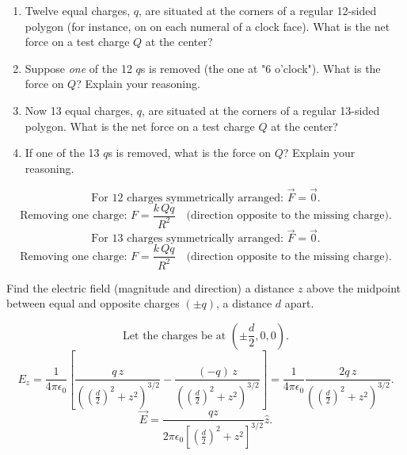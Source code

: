 \begin{hwkProblem}{2.1}{}

	\begin{enumerate}
		\item Twelve equal charges, \( q \), are situated at the corners of a regular 12-sided polygon (for instance, on on each numeral of a clock face). What is the net force on a test charge \( Q \) at the center?
		\item Suppose \textit{one} of the 12 \( q \)s is removed (the one at "6 o'clock"). What is the force on \( Q \)? Explain your reasoning.
		\item Now 13 equal charges, \( q \), are situated at the corners of a regular 13-sided polygon. What is the net force on a test charge \( Q \) at the center?
		\item If one of the 13 \( q \)s is removed, what is the force on \( Q \)? Explain your reasoning.
	\end{enumerate}

	\hwkSol

	\hwkPart
	\[
		\text{For 12 charges symmetrically arranged: } \vec{F}= \vec{0}.
	\]
	\hwkPart
	\[
		\text{Removing one charge: } F=\frac{k\,Qq}{R^2}\quad \text{(direction opposite to the missing charge)}.
	\]
	\hwkPart
	\[
		\text{For 13 charges symmetrically arranged: } \vec{F}= \vec{0}.
	\]
	\hwkPart
	\[
		\text{Removing one charge: } F=\frac{k\,Qq}{R^2}\quad \text{(direction opposite to the missing charge)}.
	\]
\end{hwkProblem}

\begin{hwkProblem}{2.2}{}

	Find the electric field (magnitude and direction) a distance \( z \) above the midpoint between equal and opposite charges \( \left( \pm q \right) \), a distance \( d \) apart.

	\hwkSol
	\[
		\text{Let the charges be at } \left(\pm \frac{d}{2},0,0\right).
	\]
	\[
		E_z=\frac{1}{4\pi\epsilon_0}\left[\frac{q\,z}{\left(\left(\frac{d}{2}\right)^2+z^2\right)^{3/2}}
		-\frac{(-q)\,z}{\left(\left(\frac{d}{2}\right)^2+z^2\right)^{3/2}}\right]
		=\frac{1}{4\pi\epsilon_0}\frac{2q\,z}{\left(\left(\frac{d}{2}\right)^2+z^2\right)^{3/2}}.
	\]
	\[
		\vec{E}=\frac{qz}{2\pi\epsilon_0\left[\left(\frac{d}{2}\right)^2+z^2\right]^{3/2}}\hat{z}.
	\]
\end{hwkProblem}


